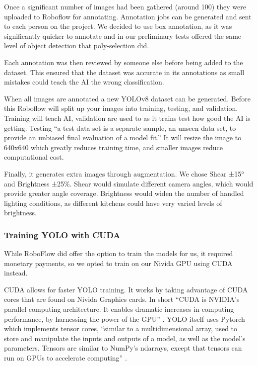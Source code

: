 \documentclass{article}
\begin{document}
Once a significant number of images had been gathered (around 100) they were uploaded to Roboflow for annotating. Annotation jobs can be generated and sent to each person on the project. We decided to use box annotation, as it was significantly quicker to annotate and in our preliminary tests offered the same level of object detection that poly-selection did.

Each annotation was then reviewed by someone else before being added to the dataset. This ensured that the dataset was accurate in its annotations as small mistakes could teach the AI the wrong classification.

When all images are annotated a new YOLOv8 dataset can be generated. Before this Roboflow will split up your images into training, testing, and validation. Training will teach AI, validation are used to as it trains test how good the AI is getting. Testing “a test data set is a separate sample, an unseen data set, to provide an unbiased final evaluation of a model fit.” \cite{trainvalidtest} It will resize the image to 640x640 which greatly reduces training time, and smaller images reduce computational cost. 

Finally, it generates extra images through augmentation. We chose Shear ±15° and Brightness ±25\%. Shear would simulate different camera angles, which would provide greater angle coverage. Brightness would widen the number of handled lighting conditions, as different kitchens could have very varied levels of brightness.

    \subsubsection{Training YOLO with CUDA}
    While RoboFlow did offer the option to train the models for us, it required monetary payments, so we opted to train on our Nivida GPU using CUDA \cite{cudacuda} instead.

    CUDA allows for faster YOLO training. It works by taking advantage of CUDA cores that are found on Nivida Graphics cards. In short “CUDA is NVIDIA’s parallel computing architecture. It enables dramatic increases in computing performance, by harnessing the power of the GPU” \cite{ghorpade2012gpgpu}. YOLO itself uses Pytorch \cite{nvidiapytorch} which implements tensor cores, “similar to a multidimensional array, used to store and manipulate the inputs and outputs of a model, as well as the model’s parameters. Tensors are similar to NumPy’s ndarrays, except that tensors can run on GPUs to accelerate computing” \cite{nvidiapytorch}. 
    
\end{document}
